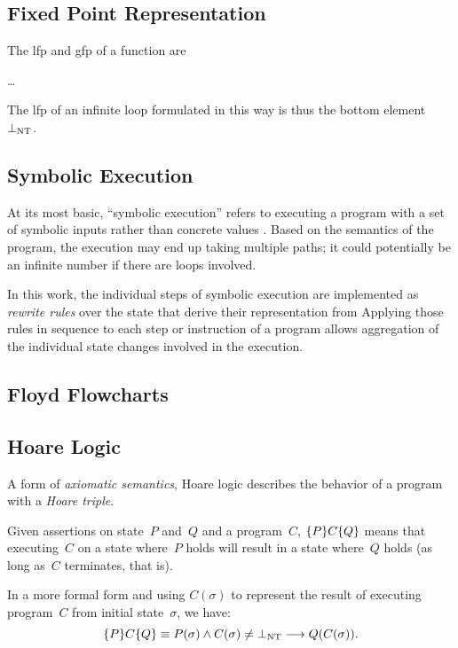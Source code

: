\subsection{Fixed Point Representation}
The \ac{lfp} and \ac{gfp} of a function are

\todo\dots

The \ac{lfp} of an infinite loop formulated in this way
is thus the bottom element $\bot_\mathrm{NT}$.%

\subsection{Symbolic Execution}
At its most basic, ``symbolic execution'' refers to
executing a program with a set of symbolic inputs
rather than concrete values \autocite{king1976symbolic}.
Based on the semantics of the program, the execution may end up taking multiple paths;
it could potentially be an infinite number if there are loops involved.


In this work, the individual steps of symbolic execution
are implemented as \emph{rewrite rules} over the state%
that derive their representation from 
Applying those rules in sequence to each step or instruction of a program
allows aggregation of the individual state changes involved in the execution.

\subsection{Floyd Flowcharts}\label{se:floyd}


\subsection{Hoare Logic}\label{se:hoare}
A form of \emph{axiomatic semantics},
Hoare logic \autocite{hoare1969axiomatic,myreen2007hoare}%
describes the behavior of a program with a \emph{Hoare triple}.
\begin{definition}
  Given assertions on state~$P$ and~$Q$ and a program~$C$,
  $\{P\}C\{Q\}$ means that executing~$C$ on a state where~$P$ holds
  will result in a state where~$Q$ holds (as long as~$C$ terminates, that is).

  In a more formal form and using $C(\sigma)$ to represent the result
  of executing program~$C$ from initial state~$\sigma$, we have:
  \begin{equation*}
    \{P\}C\{Q\}\equiv P(\sigma)\wedge C(\sigma)\neq\bot_\mathrm{NT}\longrightarrow
    Q(C(\sigma)).
  \end{equation*}
\end{definition}

